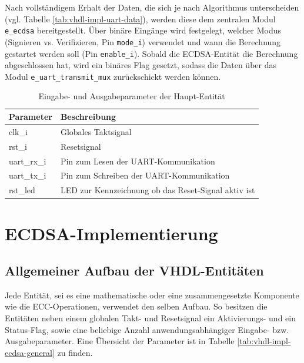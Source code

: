 Nach vollständigem Erhalt der Daten, die sich je nach Algorithmus unterscheiden (vgl. Tabelle \ref{tab:vhdl-impl-uart-data}), werden diese dem zentralen Modul \texttt{e\_ecdsa} bereitgestellt. Über binäre Eingänge wird festgelegt, welcher Modus (Signieren vs. Verifizieren, Pin \texttt{mode\_i}) verwendet und wann die Berechnung gestartet werden soll (Pin \texttt{enable\_i}). Sobald die ECDSA-Entität die Berechnung abgeschlossen hat, wird ein binäres Flag gesetzt, sodass die Daten über das Modul \texttt{e\_uart\_transmit\_mux} zurückschickt werden können. \\
 
\begin{table} [h]
	\centering 
	\begin{tabular}{ | p{3cm} | p{12cm} | }
		\hline
		\textbf{Parameter} & \textbf{Beschreibung}\\
		\hline
		clk\_i & Globales Taktsignal \\
		\hline
		rst\_i & Resetsignal \\
		\hline
		uart\_rx\_i & Pin zum Lesen der UART-Kommunikation \\
		\hline
		uart\_tx\_i & Pin zum Schreiben der UART-Kommunikation \\
		\hline
		rst\_led & LED zur Kennzeichnung ob das Reset-Signal aktiv ist \\
		\hline
	\end{tabular}
	\caption{Eingabe- und Ausgabeparameter der Haupt-Entität}
	\label{tab:vhdl-impl-tld-ecdsa-param}
\end{table} 


\section{ECDSA-Implementierung}
\label{vhdl-impl-general}

\subsection{Allgemeiner Aufbau der VHDL-Entitäten}
\label{vhdl-impl-general-entity}

Jede Entität, sei es eine mathematische oder eine zusammengesetzte Komponente wie die ECC-Operationen, verwendet den selben Aufbau. So besitzen die Entitäten neben einem globalen Takt- und Resetsignal ein Aktivierungs- und ein Status-Flag, sowie eine beliebige Anzahl anwendungsabhängiger Eingabe- bzw. Ausgabeparameter. Eine Übersicht der Parameter ist in Tabelle \ref{tab:vhdl-impl-ecdsa-general} zu finden. \\

